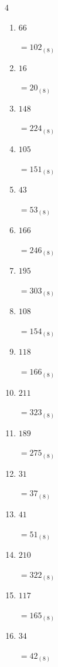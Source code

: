 \begin{multicols}{4}
\begin{enumerate}
        $=63_{(8)}$

  \item $66$

        $=102_{(8)}$

  \item $16$

        $=20_{(8)}$

  \item $148$

        $=224_{(8)}$

  \item $105$

        $=151_{(8)}$

  \item $43$

        $=53_{(8)}$

  \item $166$

        $=246_{(8)}$

  \item $195$

        $=303_{(8)}$

  \item $108$

        $=154_{(8)}$

  \item $118$

        $=166_{(8)}$

  \item $211$

        $=323_{(8)}$

  \item $189$

        $=275_{(8)}$

  \item $31$

        $=37_{(8)}$

\columnbreak %

  \item $41$

        $=51_{(8)}$

  \item $210$

        $=322_{(8)}$

  \item $117$

        $=165_{(8)}$

  \item $34$

        $=42_{(8)}$


\end{enumerate}
\end{multicols}
